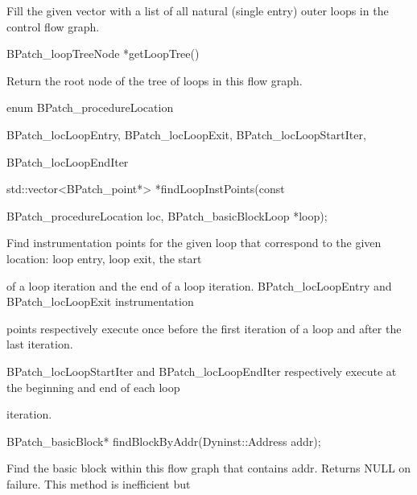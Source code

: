 {{

Fill the given vector with a list of all natural (single entry) outer loops in the control flow graph.}



{

BPatch_loopTreeNode *getLoopTree()}



{

Return the root node of the tree of loops in this flow graph.}





\bigskip



{

enum BPatch_procedureLocation { BPatch_locLoopEntry, BPatch_locLoopExit, BPatch_locLoopStartIter,

BPatch_locLoopEndIter }}





\bigskip



{

std::vector<BPatch_point*> *findLoopInstPoints(const

BPatch_procedureLocation loc, BPatch_basicBlockLoop *loop);}



{

Find instrumentation points for the given loop that correspond to the given location: loop entry, loop exit, the start

of a loop iteration and the end of a loop iteration. BPatch_locLoopEntry and BPatch_locLoopExit instrumentation

points respectively execute once before the first iteration of a loop and after the last iteration.

BPatch_locLoopStartIter and BPatch_locLoopEndIter respectively execute at the beginning and end of each loop

iteration.}



{

BPatch_basicBlock* findBlockByAddr(Dyninst::Address addr);}



{

Find the basic block within this flow graph that contains addr. Returns NULL on failure. This method is inefficient but

}}
